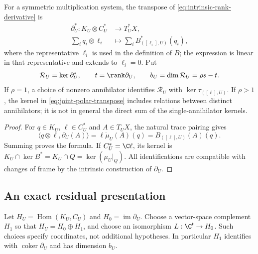 \begin{proposition}\label{prop:joint-polar-relations}
For a symmetric multiplication system, the transpose of
\eqref{eq:intrinsic-rank-derivative} is
\begin{equation}\label{eq:joint-polar-transpose}
 \begin{split}
 \partial_U^*:K_U\otimes C_U^*&\longrightarrow T_U^*X,\\
 \sum_i q_i\otimes\ell_i&\longmapsto
                    \sum_i B_{([\ell_i],U)}^*(q_i),
 \end{split}
\end{equation}
where the representative $\ell_i$ is used in the definition of $B$;
the expression is linear in that representative and extends to
$\ell_i=0$. Put
\[
 \mathcal R_U=\ker\partial_U^*,\qquad t=\rank\partial_U,
 \qquad b_U=\dim\mathcal R_U=\rho s-t.
\]
If $\rho=1$, a choice of nonzero annihilator identifies
$\mathcal R_U$ with $\ker\tau_{([\ell],U)}$. If $\rho>1$, the
kernel in \eqref{eq:joint-polar-transpose} includes relations between
distinct annihilators; it is not in general the direct sum of the
single-annihilator kernels.
\end{proposition}
\begin{proof}
For $q\in K_U$, $\ell\in C_U^*$ and $A\in T_UX$, the natural
trace pairing gives
\[
 \langle q\otimes\ell,\partial_U(A)\rangle
        =\ell\dot\mu_U(A)(q)=B_{([\ell],U)}(A)(q).
\]
Summing proves the formula. If $C_U^*=\C\ell$, its kernel is
$K_U\cap\ker B^*=K_U\cap Q=\ker(\mu_U|_Q)$.
All identifications are compatible with changes of frame by the
intrinsic construction of $\partial_U$.
\end{proof}

\subsection{An exact residual presentation}
Let $H_U=\operatorname{Hom}(K_U,C_U)$ and
$H_0=\operatorname{im}\partial_U$. Choose a vector-space complement
$H_1$ so that $H_U=H_0\oplus H_1$, and choose an isomorphism
$L:\C^t\to H_0$. Such choices specify coordinates, not additional
hypotheses. In particular $H_1$ identifies with
$\operatorname{coker}\partial_U$ and has dimension $b_U$.


